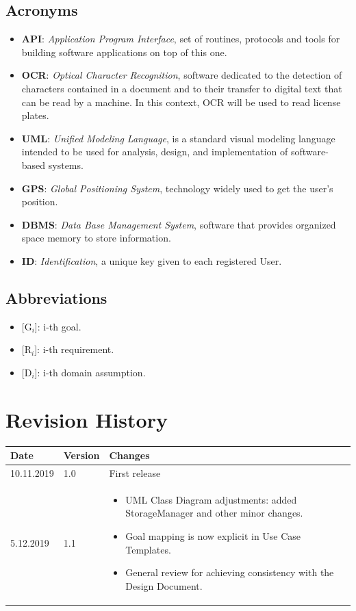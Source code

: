 \documentclass{report}
\begin{document}
\subsection{Acronyms}
\begin{itemize}
\item \textbf{API}: \textit{Application Program Interface}, set of routines, protocols and tools for building software applications on top of this one.
\item \textbf{OCR}: \textit{Optical Character Recognition}, software dedicated to the detection of characters contained in a document and to their transfer to digital text that can be read by a machine. In this context, OCR will be used to read license plates.
\item \textbf{UML}: \textit{Unified Modeling Language}, is a standard visual modeling language intended to be used for analysis, design, and implementation of software-based systems.
\item \textbf{GPS}: \textit{Global Positioning System}, technology widely used to get the user's position.
\item \textbf{DBMS}: \textit{Data Base Management System}, software that provides organized space memory to store information.
\item \textbf{ID}: \textit{Identification}, a unique key given to each registered User.
\end{itemize}
\subsection{Abbreviations}
\begin{itemize}
\item {[G$_{i}$]}: i-th goal.
\item {[R$_{i}$]}: i-th requirement.
\item {[D$_{i}$]}: i-th domain assumption.
\end{itemize}
\section{Revision History}
\begin{table}[!ht]
	\begin{tabular}{|C{.14\textwidth}|C{.12\textwidth}||C{.60\textwidth}|}
		\toprule
		\textbf{Date} & \textbf{Version} & \textbf{Changes}\\
		\midrule
		\midrule
		\vfill 10.11.2019 \vfill & \vfill 1.0 \vfill & \vfill First release \vfill\\
		\midrule
		\vspace{1.3cm} 5.12.2019 \vfill & \vspace{1.3cm} 1.1 \vfill & \begin{itemize}
			\item UML Class Diagram adjustments: added StorageManager and other minor changes.
			\item Goal mapping is now explicit in Use Case Templates.
			\item General review for achieving consistency with the Design Document.
		\end{itemize}\\
		\bottomrule
	\end{tabular}
\end{table}
\end{document}
